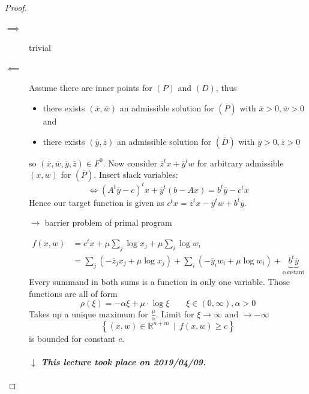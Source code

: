 \documentclass[a4paper]{article}
\newcounter{lecref}[subsection]
\numberwithin{lecref}{subsection}
\newtheorem{theorem}[lecref]{Theorem}
\newcommand{\SetDef}[2]{\left\{#1\,\mid\,#2\right\}}
\newcommand{\dateref}[1]{%
  \begin{mdframed}[backgroundcolor=gray!10,innerbottommargin=0pt,innertopmargin=0pt]
    \paragraph{\textit{$\downarrow$ This lecture took place on #1.}}%
  \end{mdframed}%
}
\begin{document}
\begin{proof}
	\begin{description}
		\item[$\mathbf \implies$] trivial
		\item[$\mathbf \impliedby$] Assume there are inner points for $(P)$ and $(D)$, thus
			\begin{itemize}
				\item there exists $(\overline x, \overline w)$ an admissible solution for $(\overline P)$ with $\overline x > 0, \overline w > 0$ and
				\item there exists $(\overline y, \overline z)$ an admissible solution for $(\overline D)$ with $\overline y > 0, \overline z > 0$
			\end{itemize}
			so $(\overline x, \overline w, \overline y, \overline z) \in F^0$.
			Now consider $\overline z^t x + \overline y^t w$ for arbitrary admissible $(x, w)$ for $(\overline P)$.
			Insert slack variables:
			\[ \iff (A^t \overline y - c)^t x + \overline y^t (b - Ax) = b^t \overline y - c^t x \]
			Hence our target function is given as $c^t x = \overline z^t x - \overline y^t w + b^t \overline y$.

			$\to$ barrier problem of primal program

			\begin{align*}
				f(x, w) &= c^t x + \mu \sum_j \log x_j + \mu \sum_i \log w_i \\
					&= \sum_j \left(- \overline z_j x_j + \mu \log x_j\right) + \sum_i \left(-\overline y_i w_i + \mu \log w_i\right) + \underbrace{b^t \overline y}_{\text{constant}}
			\end{align*}
			Every summand in both sums is a function in only one variable.
			Those functions are all of form
			\[ \rho(\xi) = -\alpha \xi + \mu \cdot \log \xi \qquad \xi \in (0, \infty), \alpha > 0 \]
			Takes up a unique maximum for $\frac \mu\alpha$. Limit for $\xi \to \infty$ and $\to -\infty$
			\[ \SetDef{(x, w) \in \mathbb R^{n + m}}{f(x, w) \geq c} \]
			is bounded for constant $c$.

			\dateref{2019/04/09}


\end{description}
\end{proof}
\end{document}
